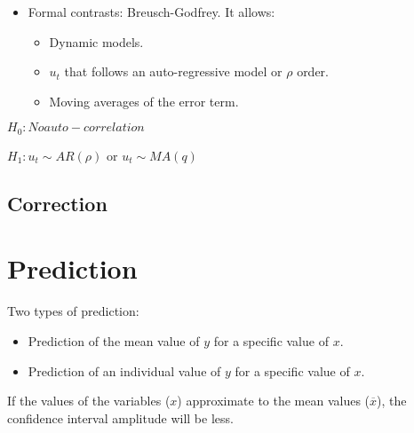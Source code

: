 \documentclass[10pt, a4paper, landscape]{extarticle}
\begin{document}
\begin{multicols}{3}
\begin{itemize}[leftmargin=*]
\item Formal contrasts: Breusch-Godfrey. It allows:
\begin{itemize}[leftmargin=*]
\item Dynamic models.
\item $u_t$ that follows an auto-regressive model or $\rho$ order.
\item Moving averages of the error term.
\end{itemize}
\end{itemize}

$H_0: No auto-correlation$

$H_1: u_t \sim AR(\rho)$ or $u_t \sim MA(q)$

\subsection*{Correction}



\section*{Prediction}

Two types of prediction:

\begin{itemize}[leftmargin=*]
\item Prediction of the mean value of $y$ for a specific value of $x$.
\item Prediction of an individual value of $y$ for a specific value of $x$.
\end{itemize}

If the values of the variables ($x$) approximate to the mean values ($\overline{x}$), the confidence interval amplitude will be less. 





\end{multicols}
\end{document}
